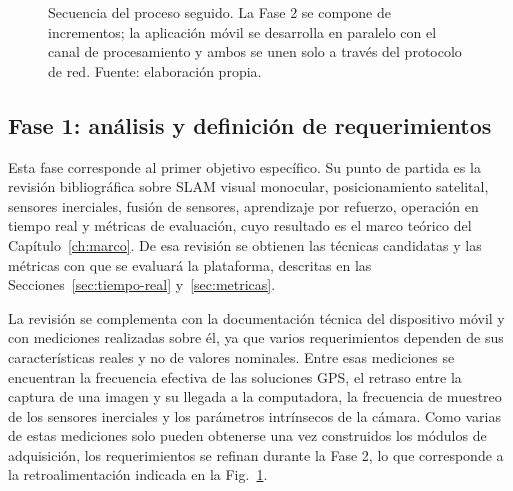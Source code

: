\begin{figure}[H]
\caption[Secuencia del proceso seguido]{Secuencia del proceso seguido. La Fase 2 se compone de incrementos; la aplicación móvil se desarrolla en paralelo con el canal de procesamiento y ambos se unen solo a través del protocolo de red. Fuente: elaboración propia.}
\label{fig:met-proceso}
\end{figure}

\subsection{Fase 1: análisis y definición de requerimientos}
\label{sec:met-fase1}

Esta fase corresponde al primer objetivo específico.
Su punto de partida es la revisión bibliográfica sobre SLAM visual monocular, posicionamiento satelital, sensores inerciales, fusión de sensores, aprendizaje por refuerzo, operación en tiempo real y métricas de evaluación, cuyo resultado es el marco teórico del Capítulo~\ref{ch:marco}.
De esa revisión se obtienen las técnicas candidatas y las métricas con que se evaluará la plataforma, descritas en las Secciones~\ref{sec:tiempo-real} y~\ref{sec:metricas}.

La revisión se complementa con la documentación técnica del dispositivo móvil y con mediciones realizadas sobre él, ya que varios requerimientos dependen de sus características reales y no de valores nominales.
Entre esas mediciones se encuentran la frecuencia efectiva de las soluciones GPS, el retraso entre la captura de una imagen y su llegada a la computadora, la frecuencia de muestreo de los sensores inerciales y los parámetros intrínsecos de la cámara.
Como varias de estas mediciones solo pueden obtenerse una vez construidos los módulos de adquisición, los requerimientos se refinan durante la Fase 2, lo que corresponde a la retroalimentación indicada en la Fig.~\ref{fig:met-proceso}.

